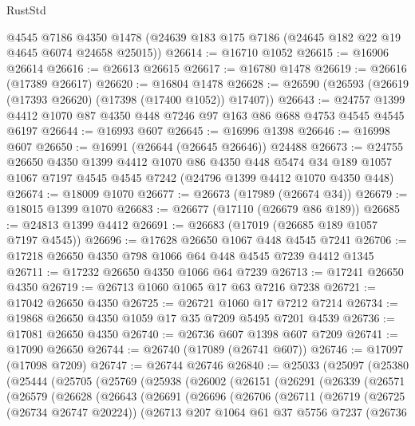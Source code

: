 \begin{lexlean}{RustStd}
\begin{coremodule}
    @4545
    @7186
    @4350
    @1478
    (@24639 @183 @175 @7186 (@24645 @182 @22 @19 @4645 @6074 @24658 @25015))
@26614 := @16710 @1052
@26615 := @16906 @26614
@26616 := @26613 @26615
@26617 := @16780 @1478
@26619 := @26616 (@17389 @26617)
@26620 := @16804 @1478
@26628 := @26590 (@26593 (@26619 (@17393 @26620) (@17398 (@17400 @1052)) @17407))
@26643 := @24757 @1399 @4412 @1070 @87 @4350 @448 @7246 @97 @163 @86 @688 @4753 @4545 @4545 @6197
@26644 := @16993 @607
@26645 := @16996 @1398
@26646 := @16998 @607
@26650 := @16991 (@26644 (@26645 @26646)) @24488
@26673 := @24755
    @26650
    @4350
    @1399
    @4412
    @1070
    @86
    @4350
    @448
    @5474
    @34
    @189
    @1057
    @1067
    @7197
    @4545
    @4545
    @7242
    (@24796 @1399 @4412 @1070 @4350 @448)
@26674 := @18009 @1070
@26677 := @26673 (@17989 (@26674 @34))
@26679 := @18015 @1399 @1070
@26683 := @26677 (@17110 (@26679 @86 @189))
@26685 := @24813 @1399 @4412
@26691 := @26683 (@17019 (@26685 @189 @1057 @7197 @4545))
@26696 := @17628 @26650 @1067 @448 @4545 @7241
@26706 := @17218 @26650 @4350 @798 @1066 @64 @448 @4545 @7239 @4412 @1345
@26711 := @17232 @26650 @4350 @1066 @64 @7239
@26713 := @17241 @26650 @4350
@26719 := @26713 @1060 @1065 @17 @63 @7216 @7238
@26721 := @17042 @26650 @4350
@26725 := @26721 @1060 @17 @7212 @7214
@26734 := @19868 @26650 @4350 @1059 @17 @35 @7209 @5495 @7201 @4539
@26736 := @17081 @26650 @4350
@26740 := @26736 @607 @1398 @607 @7209
@26741 := @17090 @26650
@26744 := @26740 (@17089 (@26741 @607))
@26746 := @17097 (@17098 @7209)
@26747 := @26744 @26746
@26840 := @25033
    (@25097
      (@25380
        (@25444
          (@25705
            (@25769
              (@25938
                (@26002
                  (@26151
                    (@26291
                      (@26339
                        (@26571
                          (@26579
                            (@26628
                              (@26643
                                (@26691
                                  (@26696
                                    (@26706
                                      (@26711
                                        (@26719
                                          (@26725 (@26734 @26747 @20224))
                                          (@26713
                                            @207
                                            @1064
                                            @61
                                            @37
                                            @5756
                                            @7237
                                            (@26736

\end{coremodule}
\end{lexlean}
